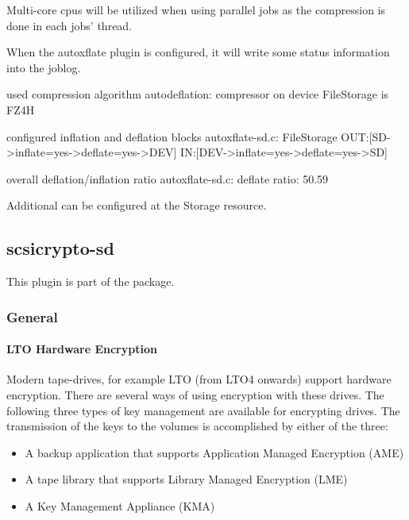 Multi-core cpus will be utilized when using parallel jobs as the compression is done in each jobs' thread.

When the autoxflate plugin is configured, it will write some status information into the joblog.

\begin{bmessage}{used compression algorithm}
autodeflation: compressor on device FileStorage is FZ4H
\end{bmessage}

\begin{bmessage}{configured inflation and deflation blocks}
autoxflate-sd.c: FileStorage OUT:[SD->inflate=yes->deflate=yes->DEV] IN:[DEV->inflate=yes->deflate=yes->SD]
\end{bmessage}

\begin{bmessage}{overall deflation/inflation ratio}
autoxflate-sd.c: deflate ratio: 50.59%
\end{bmessage}

Additional  can be configured at the Storage resource.


\subsection{scsicrypto-sd}

This plugin is part of the  package.

\subsubsection{General}

\paragraph{LTO Hardware Encryption}
\label{LTOHardwareEncryptionGeneral}

Modern tape-drives, for example LTO (from LTO4 onwards) support hardware encryption.
There are several ways of using encryption with these drives. The following three types of key management are available for encrypting drives. The transmission of the keys to the volumes is accomplished by either of the three:

\begin{itemize}
 \item A backup application that supports Application Managed Encryption (AME)
 \item A tape library that supports Library Managed Encryption (LME)
 \item A Key Management Appliance (KMA)
\end{itemize}


